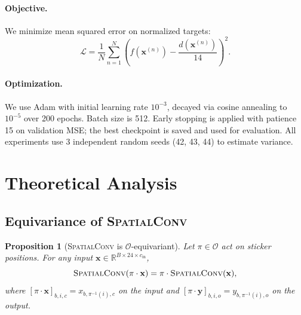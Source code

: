 \documentclass[11pt]{article}
\newtheorem{proposition}[theorem]{Proposition}
\newcommand{\bx}{\mathbf{x}}
\newcommand{\by}{\mathbf{y}}
\newcommand{\R}{\mathbb{R}}
\begin{document}
\paragraph{Objective.}
We minimize mean squared error on normalized targets:
\begin{equation}
  \mathcal{L} = \frac{1}{N} \sum_{n=1}^{N}
    \left(f(\bx^{(n)}) - \frac{d(\bx^{(n)})}{14}\right)^2.
\end{equation}

\paragraph{Optimization.}
We use Adam \cite{kingma2015adam} with initial learning rate $10^{-3}$,
decayed via cosine annealing to $10^{-5}$ over 200 epochs.
Batch size is 512.
Early stopping is applied with patience 15 on validation MSE;
the best checkpoint is saved and used for evaluation.
All experiments use 3 independent random seeds (42, 43, 44) to estimate
variance.

\section{Theoretical Analysis}
\label{sec:theory}

\subsection{Equivariance of \textsc{SpatialConv}}

\begin{proposition}[\textsc{SpatialConv} is $\mathcal{O}$-equivariant]
\label{prop:groupconv}
Let $\pi \in \mathcal{O}$ act on sticker positions.
For any input $\bx \in \R^{B \times 24 \times c_{\mathrm{in}}}$,
\begin{equation}
  \textsc{SpatialConv}(\pi \cdot \bx) = \pi \cdot \textsc{SpatialConv}(\bx),
\end{equation}
where $[\pi \cdot \bx]_{b,i,c} = x_{b,\pi^{-1}(i),c}$ on the input
and $[\pi \cdot \by]_{b,i,o} = y_{b,\pi^{-1}(i),o}$ on the output.
\end{proposition}
\end{document}
